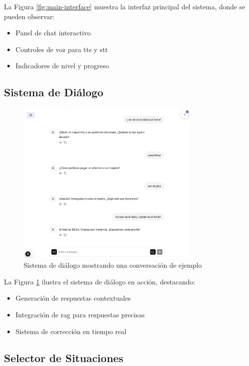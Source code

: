 La Figura \ref{fig:main-interface} muestra la interfaz principal del sistema, donde se pueden observar:
\begin{itemize}
    \item Panel de chat interactivo
    \item Controles de voz para \gls{tts} y \gls{stt}
    \item Indicadores de nivel y progreso
\end{itemize}



\subsection{Sistema de Diálogo}
\label{sistema-dialogo}

\begin{figure}[H]
    \centering
    \includegraphics[width=0.8\textwidth]{figuras/screenshots/chat-complete.png}
    \caption{Sistema de diálogo mostrando una conversación de ejemplo}
    \label{fig:dialog-system}
\end{figure}

La Figura \ref{fig:dialog-system} ilustra el sistema de diálogo en acción, destacando:
\begin{itemize}
    \item Generación de respuestas contextuales
    \item Integración de \gls{rag} para respuestas precisas
    \item Sistema de corrección en tiempo real
\end{itemize}

\subsection{Selector de Situaciones}
\label{selector-situaciones}

